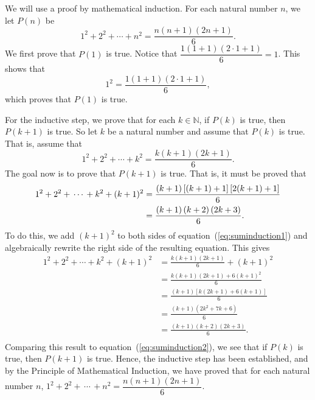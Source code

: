 \begin{myproof}
We will use a proof by mathematical induction.  For each natural number $n$, we let
$P( n )$ be
\[
1^2  + 2^2  +  \cdots  + n^2  = \dfrac{{n(n + 1)(2n + 1)}}{6}.
\]
We first prove that $P ( 1 )$ is true.  Notice that  $\dfrac{{1\left( {1 + 1} \right)\left( {2 \cdot 1 + 1} \right)}}{6} = 1$.  This shows that
\[
1^2  = \dfrac{{1\left( {1 + 1} \right)\left( {2 \cdot 1 + 1} \right)}}{6},
\]
which proves that $P( 1 )$  is true.

\newpar
For the inductive step, we prove that for each $k \in \mathbb{N}$, if $P ( k )$ is true, then 
$P( k + 1 )$ is true.  So let  $k$  be a natural number and assume that  $P( k )$  is true.  That is, assume that
%
\begin{equation} \label{eq:suminduction1}
1^2  + 2^2  +  \cdots  + k^2  = \frac{{k(k + 1)(2k + 1)}}{6}.
\end{equation}
%
The goal now is to prove that  $P\left( {k + 1} \right)$ is true.  That is, it must be proved that
\begin{align} 
1^2  + 2^2  + \, \cdots \, + k^2 + (k + 1)^2  &= \frac{{(k + 1)\left[ {(k + 1) + 1} \right]\left[ {2(k + 1) + 1} \right]}}{6} \notag \\
                                        &= \frac{{(k + 1)\left( k + 2\right) \left( 2k + 3 \right)}}{6}. 
\label{eq:suminduction2}%
\end{align}
%
To do this, we add  $\left( {k + 1} \right)^2 $ to both sides of equation~(\ref{eq:suminduction1}) and algebraically rewrite the right side of the resulting equation.  This gives
%
\[
\begin{aligned}
  1^2  + 2^2  +  \cdots  + k^2  + (k + 1)^2  &= \frac{{k(k + 1)(2k + 1)}}{6} + (k + 1)^2  \\ 
                &= \frac{{k(k + 1)(2k + 1) + 6(k + 1)^2 }}{6} \\ 
                &= \frac{{(k + 1)\left[ {k(2k + 1) + 6(k + 1)} \right]}}{6} \\ 
                &= \frac{{(k + 1)\left( {2k^2  + 7k + 6} \right)}}{6} \\ 
                &= \frac{{(k + 1)(k + 2)(2k + 3)}}{6}. \\ 
\end{aligned} 
\]
Comparing this result to equation~(\ref{eq:suminduction2}), we see that if  $P( k )$  is true, then  $P( {k + 1} )$ is true.  Hence, the inductive step has been established, and by  the Principle of Mathematical Induction, we have proved that for each natural number $n$, \linebreak
$1^2  + 2^2  + \, \cdots \, + n^2  = \dfrac{{n(n + 1)(2n + 1)}}{6}$.
\end{myproof}
\hbreak

\endinput
